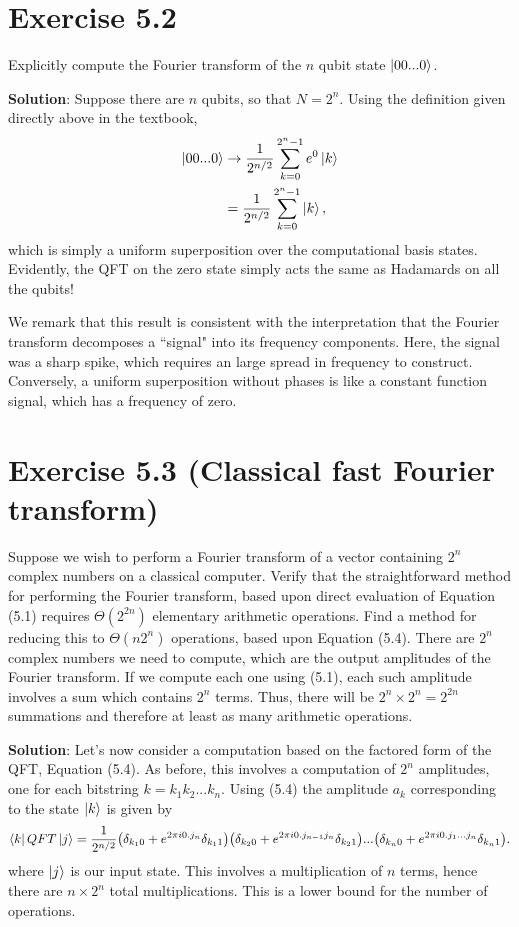 \documentclass{book}
\begin{document}
\section*{Exercise 5.2}
    Explicitly compute the Fourier transform of the $n$ qubit state $\ket{00...0}$.
    
    \textbf{Solution}: Suppose there are $n$ qubits, so that $N=2^n$. Using the definition given directly above in the textbook,
    \begin{align}
        \ket{00...0} &\rightarrow \frac{1}{2^{n/2}} \sum_{k=0}^{2^n-1}e^0 \ket{k} \\
        &= \frac{1}{2^{n/2}}\sum_{k=0}^{2^n-1}\ket{k},
    \end{align}
    which is simply a uniform superposition over the computational basis states. Evidently, the QFT on the zero state simply acts the same as Hadamards on all the qubits!
    
    We remark that this result is consistent with the interpretation that the Fourier transform decomposes a ``signal" into its frequency components. Here, the signal was a sharp spike, which requires an large spread in frequency to construct. Conversely, a uniform superposition without phases is like a constant function signal, which has a frequency of zero. 

\section*{Exercise 5.3 (Classical fast Fourier transform)} 
    Suppose we wish to perform a Fourier transform of a vector containing $2^n$ complex numbers on a classical computer. Verify that the straightforward method for performing the Fourier transform, based upon direct evaluation of Equation (5.1) requires $\Theta(2^{2n})$ elementary arithmetic operations. Find a method for reducing this to $\Theta(n2^n)$ operations, based upon Equation (5.4).
    There are $2^n$ complex numbers we need to compute, which are the output amplitudes of the Fourier transform. If we compute each one using (5.1), each such amplitude involves a sum which contains $2^n$ terms. Thus, there will be $2^n \times 2^n = 2^{2n}$ summations and therefore at least as many arithmetic operations.
    
    \textbf{Solution}: Let's now consider a computation based on the factored form of the QFT, Equation (5.4). As before, this involves a computation of $2^n$ amplitudes, one for each bitstring $k = k_1k_2...k_n$. Using (5.4) the amplitude $a_{k}$ corresponding to the state $\ket{k}$ is given by
    \begin{align}
        \bra{k}QFT\ket{j} = \frac{1}{2^{n/2}}\big(\delta_{k_1 0}+e^{2\pi i0.j_n}\delta_{k_1 1}\big)\big(\delta_{k_2 0}+e^{2\pi i0.j_{n-1}j_n}\delta_{k_2 1}\big)...\big(\delta_{k_n 0}+e^{2\pi i0.j_1...j_n}\delta_{k_n 1}\big).
    \end{align}
    where $\ket{j}$ is our input state. This involves a multiplication of $n$ terms, hence there are $n\times 2^n$ total multiplications. This is a lower bound for the number of operations. 
\end{document}

